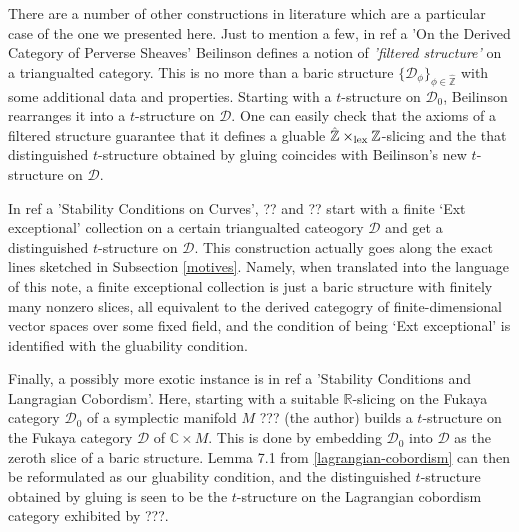 \documentclass{article}
\newcommand\blankpage{
    \null
    \thispagestyle{empty}
    \addtocounter{page}{-1}
    \newpage}
\theoremstyle{definition}
\newcommand{\Z}{\mathbb{Z}}
\newcommand{\lex}{\times_{\textnormal{lex}}}
\begin{document}
There are a number of other constructions in literature which are a particular case of the one we presented here. Just to mention a few, in {\color{red} ref a 'On the Derived Category of Perverse Sheaves'} Beilinson defines a notion of \textit{'filtered structure'} on a triangualted category. This is no more than a baric structure $\{ \mathscr{D}_{\phi} \}_{\phi \in \hat{\Z}}$ with some additional data and properties. Starting with a $t$-structure on $\mathscr{D}_0$, Beilinson rearranges it into a $t$-structure on $\mathscr{D}$. One can easily check that the axioms of a filtered structure guarantee that it defines a gluable $\hat{\Z} \lex \Z$-slicing and the that distinguished $t$-structure obtained by gluing coincides with Beilinson's new $t$-structure on $\mathscr{D}$. \\ 
\par
In {\color{red} ref a 'Stability Conditions on Curves'}, ?? and ??  start with a finite `Ext exceptional' collection on a certain triangualted cateogory $\mathscr{D}$ and get a distinguished $t$-structure on $\mathscr{D}$. This construction actually goes along the exact lines sketched in Subsection \ref{motives}. Namely, when translated into the language of this note, a finite exceptional collection is just a baric structure with finitely many nonzero slices, all equivalent to the derived categogry of finite-dimensional vector spaces over some fixed field, and the condition of being `Ext exceptional' is identified with the gluability condition. \\
\par
Finally, a possibly more exotic instance is in {\color{red} ref a 'Stability Conditions and Langragian Cobordism'}. Here, starting with a suitable $\mathbb{R}$-slicing on the Fukaya category $\mathscr{D}_0$ of a symplectic manifold $M$ ??? {\color{red}(the author)} builds a $t$-structure on the Fukaya category $\mathscr{D}$ of $\mathbb{C} \times M$. This is done by embedding $\mathscr{D}_0$ into $\mathscr{D}$ as the zeroth slice of a baric structure. Lemma 7.1 from \ref{lagrangian-cobordism} can then be reformulated as our gluability condition, and the distinguished $t$-structure obtained by gluing is seen to be the $t$-structure on the Lagrangian cobordism category exhibited by ???. \\


\newpage

\afterpage{\blankpage}
\clearpage 

\end{document}
